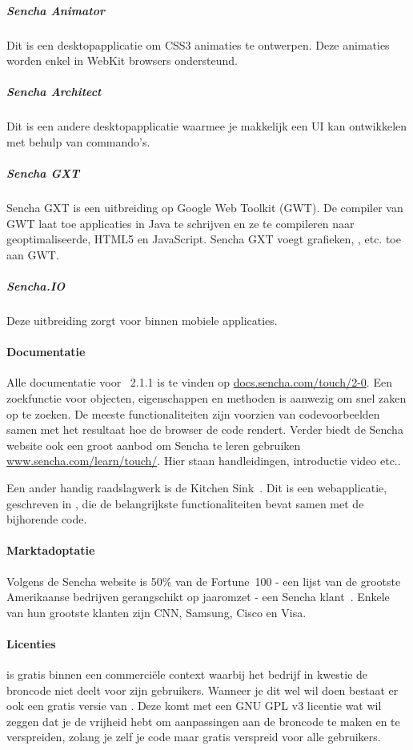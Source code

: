 \subparagraph{Sencha Animator}
Dit is een desktopapplicatie om CSS3 animaties te ontwerpen.  
Deze animaties worden enkel in WebKit browsers ondersteund.

\subparagraph{Sencha Architect}
Dit is een andere desktopapplicatie waarmee je makkelijk een UI kan ontwikkelen met behulp van  commando's.  

\subparagraph{Sencha GXT}
Sencha GXT is een uitbreiding op Google Web Toolkit (GWT).  
De compiler van GWT laat toe applicaties in Java te schrijven en ze te compileren naar geoptimaliseerde,   HTML5 en JavaScript.  
Sencha GXT voegt grafieken,  , etc. toe aan GWT.

\subparagraph{Sencha.IO}
Deze uitbreiding zorgt voor  binnen mobiele applicaties.  

\paragraph{Documentatie}
Alle documentatie voor \st{}~2.1.1 is te vinden op \url{docs.sencha.com/touch/2-0}.  
Een zoekfunctie voor objecten,  eigenschappen en methoden is aanwezig om snel zaken op te zoeken.  
De meeste functionaliteiten zijn voorzien van codevoorbeelden samen met het resultaat hoe de browser de code rendert.  
Verder biedt de Sencha website ook een groot aanbod om Sencha te leren gebruiken \url{www.sencha.com/learn/touch/}.  
Hier staan handleidingen,  introductie video etc..

Een ander handig raadslagwerk is de Kitchen Sink~\cite{Inc.2013}.  
Dit is een webapplicatie,  geschreven in \st{},  die de belangrijkste functionaliteiten bevat samen met de bijhorende code.  

\paragraph{Marktadoptatie}
Volgens de Sencha website is 50\% van de Fortune~100 - een lijst van de grootste Amerikaanse bedrijven gerangschikt op jaaromzet - een Sencha klant~\cite{Inc.}.  
Enkele van hun grootste klanten zijn CNN,  Samsung,  Cisco en  Visa.

\paragraph{Licenties}
\st{} is gratis binnen een commerciële context waarbij het bedrijf in kwestie de broncode niet deelt voor zijn gebruikers.  
Wanneer je dit wel wil doen bestaat er ook een gratis  versie van \st{}.  
Deze komt met een GNU GPL v3  licentie wat wil zeggen dat je de vrijheid hebt om aanpassingen aan de broncode te maken en te verspreiden,  zolang je zelf je code maar gratis verspreid voor alle gebruikers.
  
